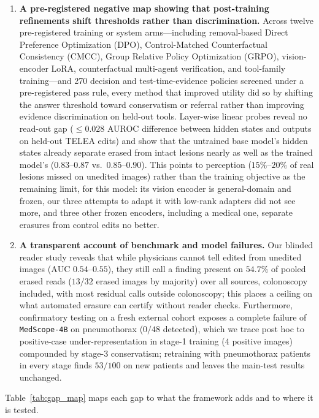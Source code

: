 \documentclass[5p,times,twocolumn,authoryear]{elsarticle}
\begin{document}
\begin{enumerate}[leftmargin=*,nosep]
    \item \textbf{A pre-registered negative map showing that post-training refinements shift thresholds rather than discrimination.} Across twelve pre-registered training or system arms---including removal-based Direct Preference Optimization (DPO), Control-Matched Counterfactual Consistency (CMCC), Group Relative Policy Optimization (GRPO), vision-encoder LoRA, counterfactual multi-agent verification, and tool-family training---and 270 decision and test-time-evidence policies screened under a pre-registered pass rule, every method that improved utility did so by shifting the answer threshold toward conservatism or referral rather than improving evidence discrimination on held-out tools. Layer-wise linear probes reveal no read-out gap ($\le 0.028$ AUROC difference between hidden states and outputs on held-out TELEA edits) and show that the untrained base model's hidden states already separate erased from intact lesions nearly as well as the trained model's ($0.83\text{--}0.87$ vs.\ $0.85\text{--}0.90$). This points to perception ($15\%\text{--}20\%$ of real lesions missed on unedited images) rather than the training objective as the remaining limit, for this model: its vision encoder is general-domain and frozen, our three attempts to adapt it with low-rank adapters did not see more, and three other frozen encoders, including a medical one, separate erasures from control edits no better.
    \item \textbf{A transparent account of benchmark and model failures.} Our blinded reader study reveals that while physicians cannot tell edited from unedited images ($\text{AUC } 0.54\text{--}0.55$), they still call a finding present on $54.7\%$ of pooled erased reads ($13/32$ erased images by majority) over all sources, colonoscopy included, with most residual calls outside colonoscopy; this places a ceiling on what automated erasure can certify without reader checks. Furthermore, confirmatory testing on a fresh external cohort exposes a complete failure of \texttt{MedScope-4B} on pneumothorax ($0/48$ detected), which we trace post hoc to positive-case under-representation in stage-1 training ($4$ positive images) compounded by stage-3 conservatism; retraining with pneumothorax patients in every stage finds $53/100$ on new patients and leaves the main-test results unchanged.
\end{enumerate}

Table~\ref{tab:gap_map} maps each gap to what the framework adds and to where it is tested.
\end{document}
